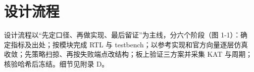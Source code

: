 \Needspace{85pt}

\section{设计流程}

设计流程以“先定口径、再做实现、最后留证”为主线，分六个阶段（图 1-1）：确定指标及出处；按模块完成 RTL 与 testbench；以参考实现和官方向量逐层仿真收敛；先策略扫掠、再按失败端点改结构；板上验证三方案并采集 KAT 与周期；核验哈希后冻结。细节见附录 D。

